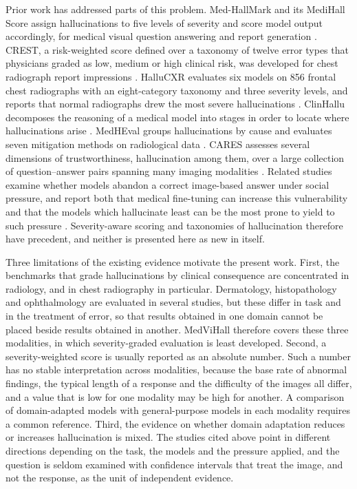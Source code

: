 \documentclass[11pt,a4paper]{article}
\begin{document}
Prior work has addressed parts of this problem. Med-HallMark and its MediHall Score assign hallucinations to five levels of severity and score model output accordingly, for medical visual question answering and report generation \citep{chen2024medhallmark}. CREST, a risk-weighted score defined over a taxonomy of twelve error types that physicians graded as low, medium or high clinical risk, was developed for chest radiograph report impressions \citep{crest2025medrxiv}. HalluCXR evaluates six models on 856 frontal chest radiographs with an eight-category taxonomy and three severity levels, and reports that normal radiographs drew the most severe hallucinations \citep{wang2026hallucxr}. ClinHallu decomposes the reasoning of a medical model into stages in order to locate where hallucinations arise \citep{yang2026clinhallu}. MedHEval groups hallucinations by cause and evaluates seven mitigation methods on radiological data \citep{chang2025medheval}. CARES assesses several dimensions of trustworthiness, hallucination among them, over a large collection of question--answer pairs spanning many imaging modalities \citep{xia2024cares}. Related studies examine whether models abandon a correct image-based answer under social pressure, and report both that medical fine-tuning can increase this vulnerability \citep{xu2025sycophancy} and that the models which hallucinate least can be the most prone to yield to such pressure \citep{aranya2026grounding}. Severity-aware scoring and taxonomies of hallucination therefore have precedent, and neither is presented here as new in itself.

Three limitations of the existing evidence motivate the present work. First, the benchmarks that grade hallucinations by clinical consequence are concentrated in radiology, and in chest radiography in particular. Dermatology, histopathology and ophthalmology are evaluated in several studies, but these differ in task and in the treatment of error, so that results obtained in one domain cannot be placed beside results obtained in another. MedViHall therefore covers these three modalities, in which severity-graded evaluation is least developed. Second, a severity-weighted score is usually reported as an absolute number. Such a number has no stable interpretation across modalities, because the base rate of abnormal findings, the typical length of a response and the difficulty of the images all differ, and a value that is low for one modality may be high for another. A comparison of domain-adapted models with general-purpose models in each modality requires a common reference. Third, the evidence on whether domain adaptation reduces or increases hallucination is mixed. The studies cited above point in different directions depending on the task, the models and the pressure applied, and the question is seldom examined with confidence intervals that treat the image, and not the response, as the unit of independent evidence.
\end{document}
